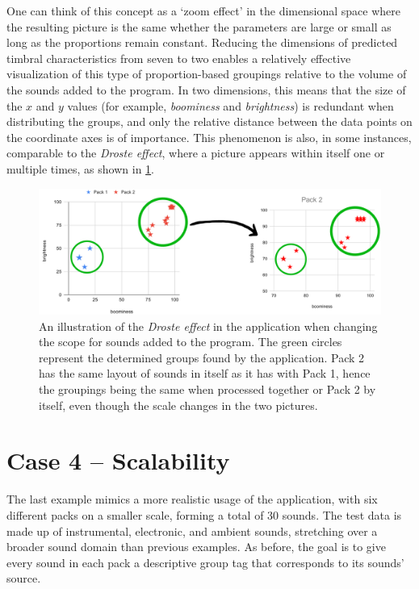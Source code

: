 \newpage One can think of this concept as a `zoom effect' in the dimensional space where the resulting picture is the same whether the parameters are large or small as long as the proportions remain constant. Reducing the dimensions of predicted timbral characteristics from seven to two enables a relatively effective visualization of this type of proportion-based groupings relative to the volume of the sounds added to the program. In two dimensions, this means that the size of the \(x\) and \(y\) values (for example, \emph{boominess} and \emph{brightness}) is redundant when distributing the groups, and only the relative distance between the data points on the coordinate axes is of importance. This phenomenon is also, in some instances, comparable to the \emph{Droste effect}, where a picture appears within itself one or multiple times, as shown in \cref{fig:case_3/demo-3}.
\begin{figure}[ht]
    \includegraphics[width=\textwidth]{figures/case_3/demo-3}
    \caption[An illustration of the \emph{Droste effect} in the application.]{An illustration of the \emph{Droste effect} in the application when changing the scope for sounds added to the program. The green circles represent the determined groups found by the application. Pack 2 has the same layout of sounds in itself as it has with Pack 1, hence the groupings being the same when processed together or Pack 2 by itself, even though the scale changes in the two pictures.}\label{fig:case_3/demo-3}
\end{figure}
\clearpage

\newpage\section{Case 4 – Scalability}
The last example mimics a more realistic usage of the application, with six different packs on a smaller scale, forming a total of 30 sounds. The test data is made up of instrumental, electronic, and ambient sounds, stretching over a broader sound domain than previous examples. As before, the goal is to give every sound in each pack a descriptive group tag that corresponds to its sounds' source.

